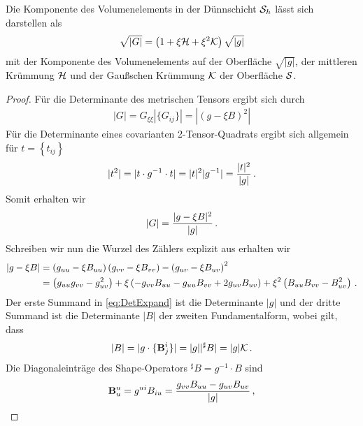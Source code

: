 \documentclass[a4paper,11pt]{scrartcl}
\newcommand{\surfh}{\surf_{h}}
\begin{document}
\begin{thm}
  Die Komponente des Volumenelements in der Dünnschicht \( \surfh \) lässt sich darstellen als
  \begin{align}
    \sqrt{|G|} = \left( 1 + \xi\mathcal{H} + \xi^{2}\mathcal{K} \right)\sqrt{|g|}
  \end{align}
  mit der Komponente des Volumenelements auf der Oberfläche \( \sqrt{|g|} \), 
  der mittleren Krümmung \( \mathcal{H} \) und der Gaußschen Krümmung \( \mathcal{K} \) der Oberfläche \( \mathcal{S} \). 
\end{thm}
\begin{proof}
  Für die Determinante des metrischen Tensors ergibt sich durch
  \begin{align}
    |G| = G_{\xi\xi}|\{G_{ij}\}| = |\left( g-\xi B \right)^{2}| \label{eq:Det2Full}
  \end{align}
  Für die Determinante eines covarianten 2-Tensor-Quadrats ergibt sich allgemein für \( t=\left\{ t_{ij} \right\} \)
  \begin{align}
    |t^{2}| = |t\cdot g^{-1}\cdot t| = |t|^{2}|g^{-1}| = \frac{|t|^{2}}{|g|}\,\text{.}
  \end{align}
  Somit erhalten wir
  \begin{align}
    |G| = \frac{|g-\xi B |^{2}}{|g|}\,\text{.}\label{eq:detG2}
  \end{align}
  Schreiben wir nun die Wurzel des Zählers explizit aus erhalten wir
  \begin{align}
    |g-\xi B | &= \left( g_{uu}-\xi B_{uu} \right)\left( g_{vv} - \xi B_{vv} \right) - \left( g_{uv} - \xi B_{uv} \right)^{2}\\
     &= \left( g_{uu}g_{vv} - g^{2}_{uv} \right)
        + \xi \left( -g_{vv}B_{uu} - g_{uu}B_{vv} + 2g_{uv}B_{uv}  \right)
        + \xi^{2} \left( B_{uu}B_{vv} - B^{2}_{uv} \right) \label{eq:DetExpand} \,\text{.}
  \end{align}
  Der erste Summand in \eqref{eq:DetExpand} ist die Determinante \( |g| \)
  und der dritte Summand ist die Determinante \( |B| \) der zweiten Fundamentalform, wobei gilt, dass
  \begin{align}
    |B| = |g\cdot \{\mathbf{B}{^{i}_{j}}\}| = |g| |^{\sharp}B| = |g| \mathcal{K} \,\text{.}
  \end{align}
  Die Diagonaleinträge des Shape-Operators \( ^{\sharp}B = g^{-1} \cdot B \) sind
  \begin{align}
    \tensor{B}{^{u}_{u}} &= g^{ui} B_{iu} = \frac{g_{vv}B_{uu}-g_{uv}B_{uv}}{|g|} \formComma \\

\end{align}
\end{proof}
\end{document}
